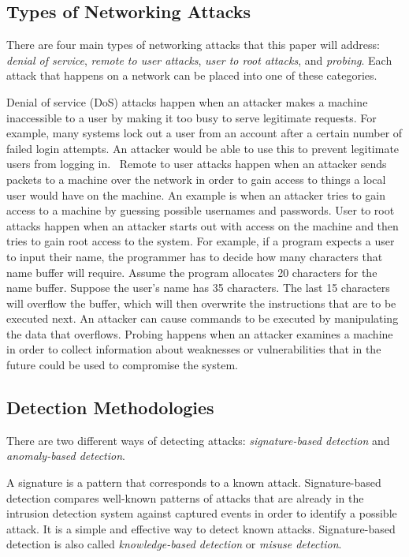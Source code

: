 \documentclass{sig-alternate}
\begin{document}
\subsection{Types of Networking Attacks}
There are four main types of networking attacks that this paper will address: \emph{denial of service}, \emph{remote to user attacks}, \emph{user to root attacks}, and \emph{probing}. Each attack that happens on a network can be placed into one of these categories.~\cite{DBLP:journals/corr/abs-1204-1336}

Denial of service (DoS) attacks happen when an attacker makes a machine inaccessible to a user by making it too busy to serve legitimate requests. For example, many systems lock out a user from an account after a certain number of failed login attempts. An attacker would be able to use this to prevent legitimate users from logging in.~\cite{DoSAttacks} Remote to user attacks happen when an attacker sends packets to a machine over the network in order to gain access to things a local user would have on the machine. An example is when an attacker tries to gain access to a machine by guessing possible usernames and passwords. User to root attacks happen when an attacker starts out with access on the machine and then tries to gain root access to the system. For example, if a program expects a user to input their name, the programmer has to decide how many characters that name buffer will require. Assume the program allocates 20 characters for the name buffer. Suppose the user's name has 35 characters. The last 15 characters will overflow the buffer, which will then overwrite the instructions that are to be executed next. An attacker can cause commands to be executed by manipulating the data that overflows. Probing happens when an attacker examines a machine in order to collect information about weaknesses or vulnerabilities that in the future could be used to compromise the system.~\cite{DBLP:journals/corr/abs-1204-1336, typesOfAttacks}




\subsection{Detection Methodologies}
There are two different ways of detecting attacks: \emph{signature-based detection} and \emph{anomaly-based detection}. 

A signature is a pattern that corresponds to a known attack. Signature-based detection compares well-known patterns of attacks that are already in the intrusion detection system against captured events in order to identify a possible attack. It is a simple and effective way to detect known attacks. Signature-based detection is also called \emph{knowledge-based detection} or \emph{misuse detection}.~\cite{Liao201316}
\end{document}
